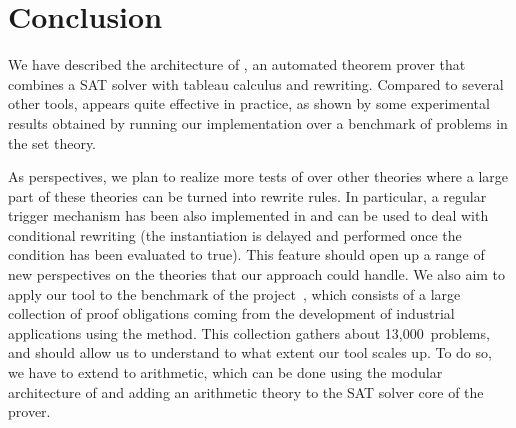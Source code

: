 
\section{Conclusion}

We have described the architecture of \archsat{}, an automated theorem prover
that combines a SAT solver with tableau calculus and rewriting. Compared to
several other tools, \archsat{} appears quite effective in practice, as shown by
some experimental results obtained by running our implementation over a
benchmark of problems in the \bmth{} set theory.

As perspectives, we plan to realize more tests of \archsat{} over other theories
where a large part of these theories can be turned into rewrite rules. In
particular, a regular trigger mechanism has been also implemented in \archsat{}
and can be used to deal with conditional rewriting (the instantiation is delayed
and performed once the condition has been evaluated to true). This feature
should  open up a range of new perspectives on the theories that our approach
could handle. We also aim to apply our tool to the benchmark of the \bware{}
project~\cite{BWare}, which consists of a large collection of proof obligations
coming from the development of industrial applications using the \bmth{} method.
This collection gathers about 13,000~problems, and should allow us to understand
to what extent our tool scales up. To do so, we have to extend \archsat{} to
arithmetic, which can be done using the modular architecture of \archsat{} and
adding an arithmetic theory to the SAT solver core of the prover.
